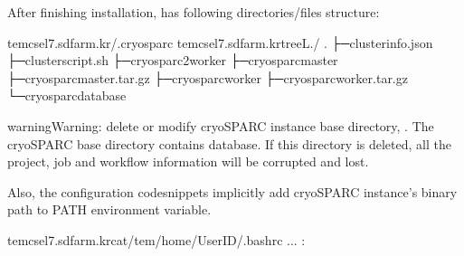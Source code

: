 \documentclass[a4paper,10pt,english]{sphinxmanual}
\begin{document}
\sphinxAtStartPar
After finishing installation,  has following directories/files structure:

\begin{sphinxVerbatim}[commandchars=\\\{\}]
tem\PYGZhy{}cs\PYGZhy{}el7.sdfarm.kr\PYGZdl{}\PYGZgt{}\PYGZti{}/.cryosparc
tem\PYGZhy{}cs\PYGZhy{}el7.sdfarm.kr\PYGZdl{}\PYGZgt{}tree\PYGZhy{}L./
.
├─cluster\PYGZus{}info.json
├─cluster\PYGZus{}script.sh
├─cryosparc2\PYGZus{}worker
├─cryosparc\PYGZus{}master
├─cryosparc\PYGZus{}master.tar.gz
├─cryosparc\PYGZus{}worker
├─cryosparc\PYGZus{}worker.tar.gz
└─cryosparc\PYGZus{}database
\end{sphinxVerbatim}

\begin{sphinxadmonition}{warning}{Warning:}
\sphinxAtStartPar
{}  delete or modify cryoSPARC instance base directory, . The cryoSPARC base directory contains database. If this directory is deleted,
all the project, job and workflow information will be corrupted and lost.
\end{sphinxadmonition}

\sphinxAtStartPar
Also, the configuration code\sphinxhyphen{}snippets implicitly add cryoSPARC instance’s binary path to PATH environment variable.

\begin{sphinxVerbatim}[commandchars=\\\{\}]
tem\PYGZhy{}cs\PYGZhy{}el7.sdfarm.kr\PYGZdl{}\PYGZgt{}cat/tem/home/\PYGZlt{}UserID\PYGZgt{}/.bashrc
...
:
\end{sphinxVerbatim}
\end{document}
